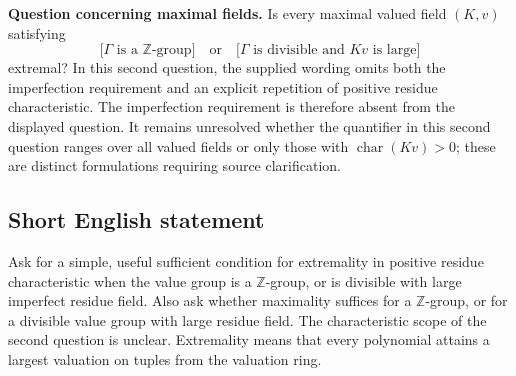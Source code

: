 \documentclass[11pt]{article}
\begin{document}
\textbf{Question concerning maximal fields.} Is every maximal valued field \((K,v)\) satisfying
\[
\bigl[\Gamma\text{ is a }\mathbb Z\text{-group}\bigr]
\quad\text{or}\quad
\bigl[\Gamma\text{ is divisible and }Kv\text{ is large}\bigr]
\]
extremal? In this second question, the supplied wording omits both the imperfection requirement and an explicit repetition of positive residue characteristic. The imperfection requirement is therefore absent from the displayed question. It remains unresolved whether the quantifier in this second question ranges over all valued fields or only those with \(\operatorname{char}(Kv)>0\); these are distinct formulations requiring source clarification.
\subsection{Short English statement}
Ask for a simple, useful sufficient condition for extremality in positive residue characteristic when the value group is a \(\mathbb Z\)-group, or is divisible with large imperfect residue field. Also ask whether maximality suffices for a \(\mathbb Z\)-group, or for a divisible value group with large residue field. The characteristic scope of the second question is unclear. Extremality means that every polynomial attains a largest valuation on tuples from the valuation ring.
\end{document}

